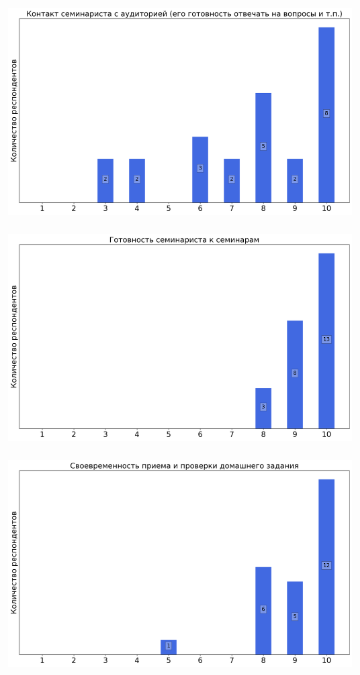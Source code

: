 		\begin{figure}[H]
			\centering
			\begin{subfigure}[b]{0.45\textwidth}
				\centering
				\includegraphics[width=\textwidth]{images/1 course/Дискретный анализ/seminarists-marks-Бурцев А.А.-0.png}
			\end{subfigure}
			\begin{subfigure}[b]{0.45\textwidth}
				\centering
				\includegraphics[width=\textwidth]{images/1 course/Дискретный анализ/seminarists-marks-Бурцев А.А.-1.png}
			\end{subfigure}
			\begin{subfigure}[b]{0.45\textwidth}
				\centering
				\includegraphics[width=\textwidth]{images/1 course/Дискретный анализ/seminarists-marks-Бурцев А.А.-2.png}

\end{subfigure}
\end{figure}
